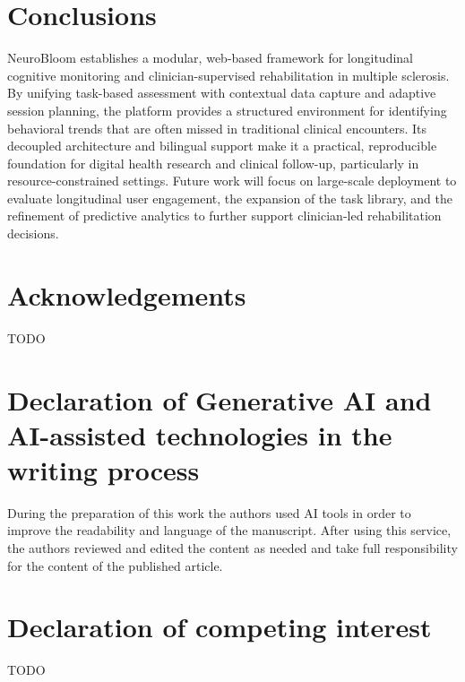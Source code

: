 \documentclass[preprint,12pt,a4paper]{elsarticle}
\begin{document}
\section{Conclusions}
NeuroBloom establishes a modular, web-based framework for longitudinal cognitive monitoring and clinician-supervised rehabilitation in multiple sclerosis. By unifying task-based assessment with contextual data capture and adaptive session planning, the platform provides a structured environment for identifying behavioral trends that are often missed in traditional clinical encounters. Its decoupled architecture and bilingual support make it a practical, reproducible foundation for digital health research and clinical follow-up, particularly in resource-constrained settings. Future work will focus on large-scale deployment to evaluate longitudinal user engagement, the expansion of the task library, and the refinement of predictive analytics to further support clinician-led rehabilitation decisions.

\section*{Acknowledgements}
TODO

\section*{Declaration of Generative AI and AI-assisted technologies in the writing process}
During the preparation of this work the authors used AI tools in order to improve the readability and language of the manuscript. After using this service, the authors reviewed and edited the content as needed and take full responsibility for the content of the published article.

\section*{Declaration of competing interest}
TODO
\end{document}
